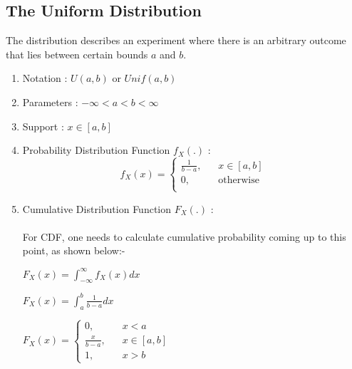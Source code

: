 \documentclass[12pt, a4paper, titlepage]{article}
\begin{document}
\subsection{The Uniform Distribution}
The distribution describes an experiment where there is an arbitrary outcome that lies between certain bounds $a$ and $b$.\\
\begin{enumerate}
	\item{Notation : $U(a,b)$ or $Unif(a,b)$}
	\item{Parameters : $-\infty < a < b < \infty$}
	\item{Support : $x \in [a,b]$}
	\item{Probability Distribution Function $f_X(.)$ :  \[   
f_X(x) = 
     \begin{cases}
       \text{$\frac{1}{b-a}$,} &\quad \text{$x \in [a,b]$}\\
       \text{0,} &\quad \text{otherwise}\\
     \end{cases}
\]}
	\item{Cumulative Distribution Function $F_X(.)$ : \\\\ For CDF, one needs to calculate cumulative probability coming up to this point, as shown below:-\\\newpage 

			\begin{center}

					$F_X(x) = \int_{-\infty}^{\infty} f_X(x) dx $

					$F_X(x) = \int_{a}^{b} \frac{1}{b-a} dx $

					$F_X(x) = \begin{cases}
	\text{0,} &\quad \text{$x < a$}\\
       \text{$\frac{x}{b-a}$,} &\quad \text{$x \in [a,b]$}\\
	\text{1,} &\quad \text{$x > b$}
     \end{cases}$	
			\end{center}

}
\end{enumerate}
\end{document}
